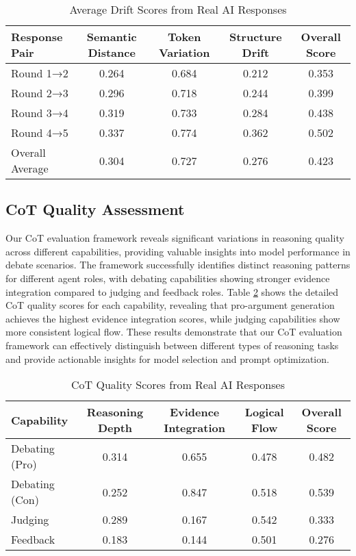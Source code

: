 \documentclass[11pt]{article}
\begin{document}
\begin{table}[h]
\centering
\caption{Average Drift Scores from Real AI Responses}
\label{tab:drift_results}
\begin{tabular}{lcccc}
\toprule
Response Pair & Semantic Distance & Token Variation & Structure Drift & Overall Score \\
\midrule
Round 1→2 & 0.264 & 0.684 & 0.212 & 0.353 \\
Round 2→3 & 0.296 & 0.718 & 0.244 & 0.399 \\
Round 3→4 & 0.319 & 0.733 & 0.284 & 0.438 \\
Round 4→5 & 0.337 & 0.774 & 0.362 & 0.502 \\
Overall Average & 0.304 & 0.727 & 0.276 & 0.423 \\
\bottomrule
\end{tabular}
\end{table}

\subsection{CoT Quality Assessment}

Our CoT evaluation framework reveals significant variations in reasoning quality across different capabilities, providing valuable insights into model performance in debate scenarios. The framework successfully identifies distinct reasoning patterns for different agent roles, with debating capabilities showing stronger evidence integration compared to judging and feedback roles. Table \ref{tab:cot_quality} shows the detailed CoT quality scores for each capability, revealing that pro-argument generation achieves the highest evidence integration scores, while judging capabilities show more consistent logical flow. These results demonstrate that our CoT evaluation framework can effectively distinguish between different types of reasoning tasks and provide actionable insights for model selection and prompt optimization.

\begin{table}[h]
\centering
\caption{CoT Quality Scores from Real AI Responses}
\label{tab:cot_quality}
\begin{tabular}{lcccc}
\toprule
Capability & Reasoning Depth & Evidence Integration & Logical Flow & Overall Score \\
\midrule
Debating (Pro) & 0.314 & 0.655 & 0.478 & 0.482 \\
Debating (Con) & 0.252 & 0.847 & 0.518 & 0.539 \\
Judging & 0.289 & 0.167 & 0.542 & 0.333 \\
Feedback & 0.183 & 0.144 & 0.501 & 0.276 \\
\bottomrule
\end{tabular}
\end{table}
\end{document}
